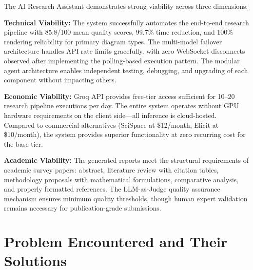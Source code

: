 \documentclass[a4paper,12pt,openany]{report}
\begin{document}
The AI Research Assistant demonstrates strong viability across three dimensions:

\textbf{Technical Viability:} The system successfully automates the end-to-end research pipeline with 85.8/100 mean quality scores, 99.7\% time reduction, and 100\% rendering reliability for primary diagram types. The multi-model failover architecture handles API rate limits gracefully, with zero WebSocket disconnects observed after implementing the polling-based execution pattern. The modular agent architecture enables independent testing, debugging, and upgrading of each component without impacting others.

\textbf{Economic Viability:} Groq API provides free-tier access sufficient for 10--20 research pipeline executions per day. The entire system operates without GPU hardware requirements on the client side---all inference is cloud-hosted. Compared to commercial alternatives (SciSpace at \$12/month, Elicit at \$10/month), the system provides superior functionality at zero recurring cost for the base tier.

\textbf{Academic Viability:} The generated reports meet the structural requirements of academic survey papers: abstract, literature review with citation tables, methodology proposals with mathematical formulations, comparative analysis, and properly formatted references. The LLM-as-Judge quality assurance mechanism ensures minimum quality thresholds, though human expert validation remains necessary for publication-grade submissions.

\section{Problem Encountered and Their Solutions}
\end{document}
